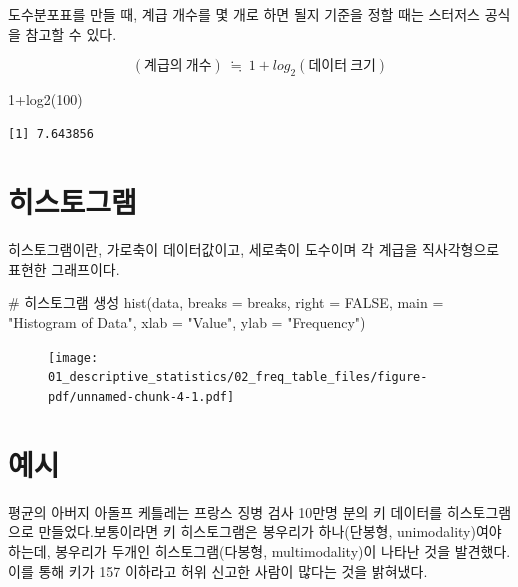 \documentclass[
  letterpaper,
  DIV=11,
  numbers=noendperiod]{scrreprt}
\newenvironment{Shaded}{\begin{snugshade}}{\end{snugshade}}
\newcommand{\AttributeTok}[1]{\textcolor[rgb]{0.40,0.45,0.13}{#1}}
\newcommand{\CommentTok}[1]{\textcolor[rgb]{0.37,0.37,0.37}{#1}}
\newcommand{\ConstantTok}[1]{\textcolor[rgb]{0.56,0.35,0.01}{#1}}
\newcommand{\DecValTok}[1]{\textcolor[rgb]{0.68,0.00,0.00}{#1}}
\newcommand{\FunctionTok}[1]{\textcolor[rgb]{0.28,0.35,0.67}{#1}}
\newcommand{\NormalTok}[1]{\textcolor[rgb]{0.00,0.23,0.31}{#1}}
\newcommand{\SpecialCharTok}[1]{\textcolor[rgb]{0.37,0.37,0.37}{#1}}
\newcommand{\StringTok}[1]{\textcolor[rgb]{0.13,0.47,0.30}{#1}}
\begin{document}
도수분포표를 만들 때, 계급 개수를 몇 개로 하면 될지 기준을 정할 때는
스터저스 공식을 참고할 수 있다.

\[(계급의\ 개수)\ \fallingdotseq\ 1+log_2 (데이터\ 크기)\]

\begin{Shaded}
\begin{Highlighting}[]
\DecValTok{1}\SpecialCharTok{+}\FunctionTok{log2}\NormalTok{(}\DecValTok{100}\NormalTok{)}
\end{Highlighting}
\end{Shaded}

\begin{verbatim}
[1] 7.643856
\end{verbatim}

\hypertarget{uxd788uxc2a4uxd1a0uxadf8uxb7a8}{%
\section{히스토그램}\label{uxd788uxc2a4uxd1a0uxadf8uxb7a8}}

히스토그램이란, 가로축이 데이터값이고, 세로축이 도수이며 각 계급을
직사각형으로 표현한 그래프이다.

\begin{Shaded}
\begin{Highlighting}[]
\CommentTok{\# 히스토그램 생성}
\FunctionTok{hist}\NormalTok{(data, }\AttributeTok{breaks =}\NormalTok{ breaks, }\AttributeTok{right =} \ConstantTok{FALSE}\NormalTok{, }\AttributeTok{main =} \StringTok{"Histogram of Data"}\NormalTok{, }\AttributeTok{xlab =} \StringTok{"Value"}\NormalTok{, }\AttributeTok{ylab =} \StringTok{"Frequency"}\NormalTok{)}
\end{Highlighting}
\end{Shaded}

\begin{figure}[H]

{\centering \texttt{[image: 01\_descriptive\_statistics/02\_freq\_table\_files/figure-pdf/unnamed-chunk-4-1.pdf]}

}

\end{figure}

\hypertarget{uxc608uxc2dc}{%
\section{예시}\label{uxc608uxc2dc}}

평균의 아버지 아돌프 케틀레는 프랑스 징병 검사 10만명 분의 키 데이터를
히스토그램으로 만들었다.보통이라면 키 히스토그램은 봉우리가 하나(단봉형,
unimodality)여야 하는데, 봉우리가 두개인 히스토그램(다봉형,
multimodality)이 나타난 것을 발견했다.이를 통해 키가 157 이하라고 허위
신고한 사람이 많다는 것을 밝혀냈다.
\end{document}
